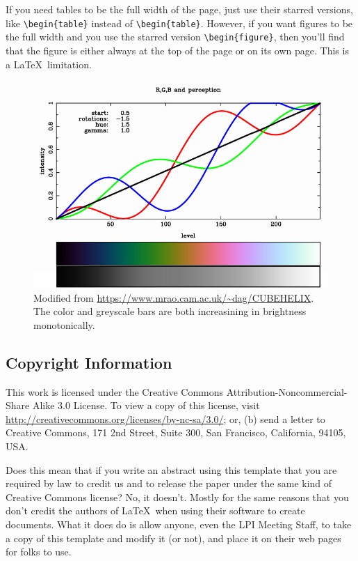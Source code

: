 \documentclass[twoside]{article}
\begin{document}
If you need tables to be the full width of the page, just use their starred versions, like \verb=\begin{table}= instead of \verb=\begin{table}=. 
However, if you want figures to be the full width and you use the starred version \verb=\begin{figure}=, then you'll find that the figure is either always at the top of the page or on its own page.
This is a \LaTeX\ limitation.

\begin{figure}
\begin{center}
\includegraphics[width=\textwidth]{rgb-grey-morehue.png}
\caption[CubeHelix Color Schemes]{
   \label{SaturationColors}
    Modified from \url{https://www.mrao.cam.ac.uk/~dag/CUBEHELIX}. 
    The color and greyscale bars are both increasining in brightness monotonically.
    }
\end{center}
\end{figure}

\subsection*{Copyright Information}

This work is licensed under the Creative Commons Attribution-Noncommercial-Share Alike 3.0 License.
To view a copy of this license, visit \url{http://creativecommons.org/licenses/by-nc-sa/3.0/}; or, (b) send a letter to Creative Commons, 171 2nd Street, Suite 300, San Francisco, California, 94105, USA.

Does this mean that if you write an abstract using this template that you are required by law to credit us and to release the paper under the same kind of Creative Commons license?
No, it doesn't.
Mostly for the same reasons that you don't credit the authors of \LaTeX\ when using their software to create documents.
What it does do is allow anyone, even the LPI Meeting Staff, to take a copy of this template and modify it (or not), and place it on their web pages for folks
to use.
\end{document}
